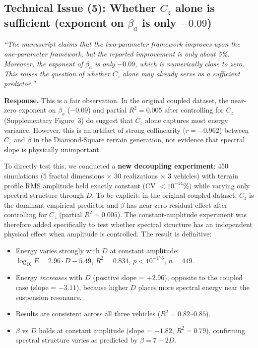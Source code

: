 \documentclass[11pt]{article}
\newcommand{\revquote}[1]{\medskip\noindent\textit{``#1''}\medskip}
\begin{document}
\subsection*{Technical Issue (5): Whether $C_z$ alone is sufficient (exponent on $\beta_a$ is only $-0.09$)}

\revquote{The manuscript claims that the two-parameter framework improves upon the one-parameter framework, but the reported improvement is only about 5\%. Moreover, the exponent of $\beta_a$ is only $-0.09$, which is numerically close to zero. This raises the question of whether $C_z$ alone may already serve as a sufficient predictor.}

\noindent\textbf{Response.} This is a fair observation. In the original coupled dataset, the near-zero exponent on $\beta_a$ ($-0.09$) and partial $R^2 = 0.005$ after controlling for $C_z$ (Supplementary Figure~3) do suggest that $C_z$ alone captures most energy variance. However, this is an artifact of strong collinearity ($r = -0.962$) between $C_z$ and $\beta$ in the Diamond-Square terrain generation, not evidence that spectral slope is physically unimportant.

To directly test this, we conducted a \textbf{new decoupling experiment}: 450 simulations (5 fractal dimensions $\times$ 30 realizations $\times$ 3 vehicles) with terrain profile RMS amplitude held exactly constant (CV $< 10^{-14}$\%) while varying only spectral structure through $D$. To be explicit: in the original coupled dataset, $C_z$ is the dominant empirical predictor and $\beta$ has near-zero residual effect after controlling for $C_z$ (partial $R^2 = 0.005$). The constant-amplitude experiment was therefore added specifically to test whether spectral structure has an independent physical effect when amplitude is controlled. The result is definitive:

\begin{itemize}[leftmargin=*]
\item Energy varies strongly with $D$ at constant amplitude: $\log_{10} E = 2.96 \cdot D - 5.49$, $R^2 = 0.834$, $p < 10^{-176}$, $n = 449$.
\item Energy \emph{increases} with $D$ (positive slope = +2.96), opposite to the coupled case (slope = $-3.11$), because higher $D$ places more spectral energy near the suspension resonance.
\item Results are consistent across all three vehicles ($R^2 = 0.82$--$0.85$).
\item $\beta$ vs $D$ holds at constant amplitude (slope = $-1.82$, $R^2 = 0.79$), confirming spectral structure varies as predicted by $\beta = 7-2D$.
\end{itemize}
\end{document}
